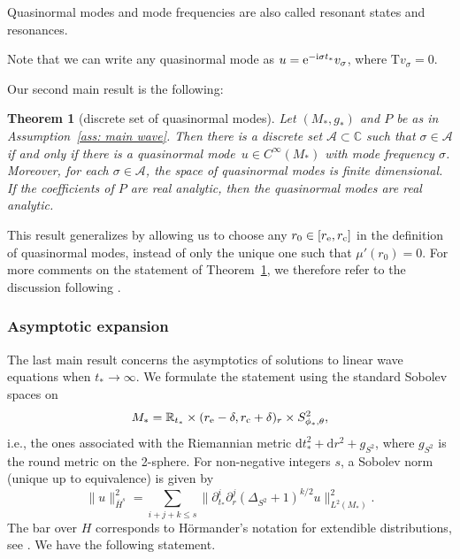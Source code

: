 \documentclass[10pt,a4paper]{amsart}
\newcommand{\A}{\mathcal A}
\newcommand{\de}{\delta}
\newcommand{\T}{\mathrm T}
\newcommand{\md}{\mathrm d}
\newcommand{\s}{\sigma}
\newcommand{\R}[0]{\mathbb{R}}
\newcommand{\C}[0]{\mathbb{C}}
\numberwithin{equation}{section}
\newtheorem{Theorem}{Theorem}[section]
\begin{document}
\begin{Remark}
Quasinormal modes and mode frequencies are also called resonant states and resonances.
\end{Remark}
\begin{Remark}
Note that we can write any quasinormal mode as
$
	u = {\rm e}^{-{\rm i} \s t_*}v_\s$,
where $\T v_\s = 0$.
\end{Remark}

Our second main result is the following:

\begin{Theorem}[discrete set of quasinormal modes] \label{thm: QNMs}
Let $(M_*, g_*)$ and $P$ be as in Assumption~{\rm\ref{ass: main wave}}.
Then there is a discrete set $\A \subset \C$ such that $\s \in \A$
if and only if there is a quasinormal mode~${u \in C^\infty(M_*)}$
with mode frequency $\s$.
Moreover, for each $\s \in \A$, the space of quasinormal modes is finite dimensional.
If the coefficients of $P$ are real analytic, then the quasinormal modes are real analytic.
\end{Theorem}

\noindent
This result generalizes \cite[Theorem~1.5]{PV2023} by allowing us to choose any $r_0 \in [r_{\rm e}, r_{\rm c}]$ in the definition of quasinormal modes, instead of only the unique one such that $\mu'(r_0) = 0$.
For more comments on the statement of Theorem~\ref{thm: QNMs}, we therefore refer to the discussion following \cite[Theorem~1.5]{PV2023}.





\subsubsection{Asymptotic expansion}

The last main result concerns the asymptotics of solutions to linear wave equations when $t_* \to \infty$.
We formulate the statement using the standard Sobolev spaces on
\[
	M_*
		= \R_{t_*} \times (r_{\rm e} - \de, r_{\rm c} + \de)_r \times S^2_{\phi_*, \theta},
\]
i.e., the ones associated with the Riemannian metric $\md t_*^2 + \md r^2 + g_{S^2}$,
where $g_{S^2}$ is the round metric on the 2-sphere.
For non-negative integers $s$, a Sobolev norm (unique up to equivalence) is given by
\[
	\|u\|_{\bar H^s}^2=\sum_{i + j + k \leq s} \bigl\|\partial_{t_*}^i \partial_r^j \left( \Delta_{S^2}+1\right)^{k/2} u\bigr\|^2_{L^2(M_*)}.
\]
The bar over $H$ corresponds to H\"ormander's notation for
extendible distributions, see \cite{HorIII}.
We have the following statement.
\end{document}

